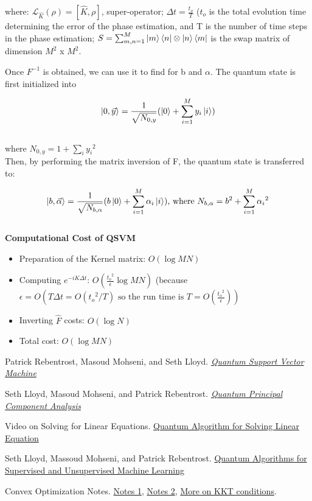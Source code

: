 \documentclass[11pt]{article}
\begin{document}
where: $\mathcal{L}_{\hat{K}}(\rho) = [\hat{K}, \rho]$, super-operator;  $\Delta t = \frac{t_{o}}{T}$ ($t_{o}$ is the total evolution time determining the error of the phase estimation, and T is the number of time steps in the phase estimation; 
$S = \sum_{m,n = 1}^{M} \ket{m}\bra{n} \otimes \ket{n} \bra{m}$ is the swap matrix of dimension $M^{2}$ x $M^{2}$. 
 
Once $F^{-1}$ is obtained, we can use it to find for b and  $\alpha$. The quantum state is first initialized into 

$$\ket{0, \vec{y}} = \frac{1}{\sqrt{N_{0,y}}} (\ket{0} + \sum_{i= 1}^{M} y_{i} \ket{i} )$$ \\

where $N_{0,y} = 1 + \sum_{i} {y_{i}}^2$ \\

Then, by performing the matrix inversion of F, the quantum state is transferred to: 

$$\ket{b, \vec{\alpha}} = \frac{1}{\sqrt{N_{b,\alpha}}} (b\ket{0} + \sum_{i=1}^{M} {\alpha}_{i} \ket{i}) \text{, where } N_{b, \alpha} = b^{2} + \sum_{i = 1}^{M} {\alpha_{i}}^{2}$$ \\

\textbf{Computational Cost of QSVM}

\begin{itemize}
\item Preparation of the Kernel matrix: $O(\log MN)$
\item Computing $e^{-i K \Delta t}$: $O(\frac{{t_{o}}^{2}}{\epsilon} \log MN)$ (because $\epsilon = O(T \Delta t = O({t_{o}}^{2} / T) \textrm{ so the run time is }  T = O(\frac{{t_{o}}^{2}}{\epsilon}))$
\item Inverting $\hat{F}$ costs: $O(\log N)$
\item Total cost: $O(\log MN)$
\end{itemize}

\begin{thebibliography}{9}
Patrick Rebentrost, Masoud Mohseni, and Seth Lloyd. 
\href{https://arxiv.org/abs/1307.0471?context=cs}{\textit{Quantum Support Vector Machine}}

Seth Lloyd, Masoud Mohseni, and Patrick Rebentrost.
\href{https://arxiv.org/abs/1307.0401}{\textit{Quantum Principal Component Analysis}}

Video on Solving for Linear Equations. 
\href{https://www.youtube.com/watch?v=KtIPAPyaPOg}{Quantum Algorithm for Solving Linear Equation}

Seth Lloyd, Massoud Mohseni, and Patrick Rebentrost. 
\href{https://arxiv.org/abs/1307.0411}{Quantum Algorithms for Supervised and Unsupervised Machine Learning}

Convex Optimization Notes. 
\href{http://cs229.stanford.edu/section/cs229-cvxopt.pdf}{Notes 1},
\href{http://cs229.stanford.edu/section/cs229-cvxopt2.pdf}{Notes 2},
\href{http://www2.imm.dtu.dk/courses/02711/lecture3.pdf}{More on KKT conditions}. 



\end{thebibliography}
 
\end{document}

